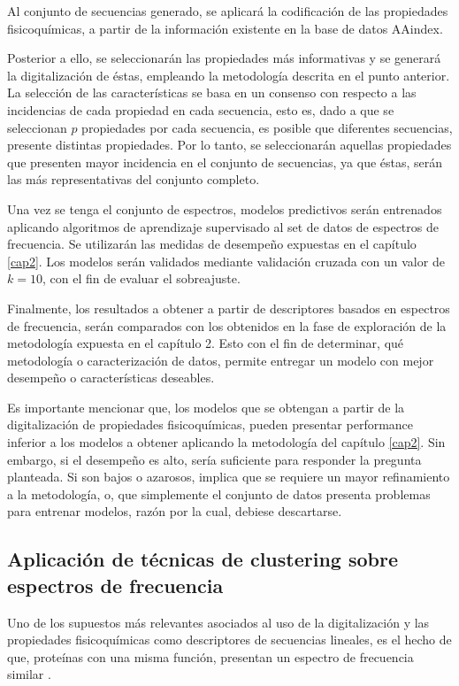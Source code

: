 Al conjunto de secuencias generado, se aplicará la codificación de las propiedades fisicoquímicas, a partir de la información existente en la base de datos AAindex.

Posterior a ello, se seleccionarán las propiedades más informativas y se generará la digitalización de éstas, empleando la metodología descrita en el punto anterior. La selección de las características se basa en un consenso con respecto a las incidencias de cada propiedad en cada secuencia, esto es, dado a que se seleccionan $p$ propiedades por cada secuencia, es posible que diferentes secuencias, presente distintas propiedades. Por lo tanto, se seleccionarán aquellas propiedades que presenten mayor incidencia en el conjunto de secuencias, ya que éstas, serán las más representativas del conjunto completo. 

Una vez se tenga el conjunto de espectros, modelos predictivos serán entrenados aplicando algoritmos de aprendizaje supervisado al set de datos de espectros de frecuencia. Se utilizarán las medidas de desempeño expuestas en el capítulo \ref{cap2}. Los modelos serán validados mediante validación cruzada con un valor de $k=10$, con el fin de evaluar el sobreajuste. 

Finalmente, los resultados a obtener a partir de descriptores basados en espectros de frecuencia, serán comparados con los obtenidos en la fase de exploración de la metodología expuesta en el capítulo 2. Esto con el fin de determinar, qué metodología o caracterización de datos, permite entregar un modelo con mejor desempeño o características deseables. 

Es importante mencionar que, los modelos que se obtengan a partir de la digitalización de propiedades fisicoquímicas, pueden presentar  performance inferior a los modelos a obtener aplicando la metodología del capítulo \ref{cap2}. Sin embargo, si el desempeño es alto, sería suficiente para responder la pregunta planteada. Si son bajos o azarosos, implica que se requiere un mayor refinamiento a la metodología, o, que simplemente el conjunto de datos presenta problemas para entrenar modelos, razón por la cual, debiese descartarse. 

\subsection{Aplicación de técnicas de clustering sobre espectros de frecuencia}

Uno de los supuestos más relevantes asociados al uso de la digitalización y las propiedades fisicoquímicas como descriptores de secuencias lineales, es el hecho de que, proteínas con una misma función, presentan un espectro de frecuencia similar \cite{veljkovic1985possible}. 

